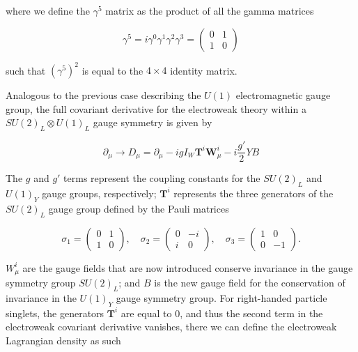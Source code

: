 where we define the $\gamma^5$ matrix as the product of all the gamma matrices

\begin{equation}
\gamma^5 = i\gamma^0 \gamma^1 \gamma^2 \gamma^3 = 
\begin{pmatrix}
0 & 1 \\
1 & 0
\end{pmatrix}
\end{equation}

such that $\left(\gamma^5\right)^2$ is equal to the $4 \times 4$ identity matrix.


Analogous to the previous case describing the $U(1)$ electromagnetic gauge group, the full covariant derivative for the electroweak theory within a $SU(2)_L \otimes U(1)_L$ gauge symmetry is given by

\begin{equation}
\partial_{\mu} \to D_{\mu} = \partial_{\mu} - ig I_W \textbf{T}^i\textbf{W}^i_{\mu} - i\frac{g'}{2}YB
\end{equation}

The $g$ and $g'$ terms represent the coupling constants for the $SU(2)_L$ and $U(1)_Y$ gauge groups, respectively; $\textbf{T}^i$ represents the three generators of the $SU(2)_L$ gauge group defined by the Pauli matrices 

\begin{equation}
\sigma_1 = 
\begin{pmatrix}
0 & 1 \\
1 & 0
\end{pmatrix}
,
\quad
\sigma_2 =
\begin{pmatrix}
0 & -i \\
i & 0
\end{pmatrix}
,
\quad 
\sigma_3 = 
\begin{pmatrix}
1 & 0 \\
0 & -1
\end{pmatrix}. 
\end{equation}

$W^i_{\mu}$ are the gauge fields that are now introduced conserve invariance in the gauge symmetry group $SU(2)_L$; and $B$ is the new gauge field for the conservation of invariance in the $U(1)_Y$ gauge symmetry group. For right-handed particle singlets, the generators $\textbf{T}^i$ are equal to 0, and thus the second term in the electroweak covariant derivative vanishes, there we can define the electroweak Lagrangian density as such

